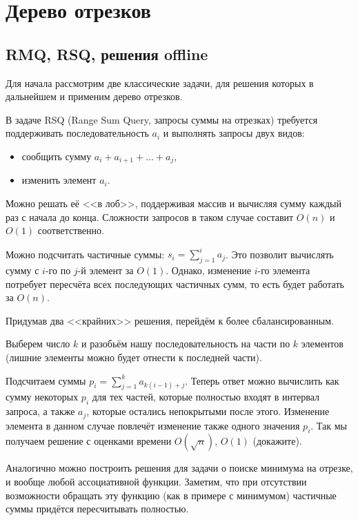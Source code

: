\documentclass[a4paper,12pt]{article}
\begin{document}
  \section{Дерево отрезков}

    \subsection{RMQ, RSQ, решения offline}

    Для начала рассмотрим две классические задачи, для
    решения которых в дальнейшем и применим дерево
    отрезков.

    В задаче RSQ (Range Sum Query, запросы суммы
    на отрезках) требуется поддерживать
    последовательность $a_i$ и выполнять запросы
    двух видов:
    \begin{itemize}
      \item сообщить сумму
        $a_i + a_{i+1} + \ldots + a_j$,
      \item изменить элемент $a_i$.
    \end{itemize}

    Можно решать её <<в лоб>>, поддерживая массив и
    вычисляя сумму каждый раз с начала до конца.
    Сложности запросов в таком случае составит
    $O(n)$ и $O(1)$ соответственно.

    Можно подсчитать частичные суммы:
    $s_i = \sum_{j=1}^{i}{a_j}$. Это позволит
    вычислять сумму с $i$-го по $j$-й элемент за
    $O(1)$. Однако, изменение $i$-го элемента потребует
    пересчёта всех последующих частичных сумм, то
    есть будет работать за $O(n)$.

    Придумав два <<крайних>> решения, перейдём
    к более сбалансированным.
    
    Выберем число $k$
    и разобьём нашу последовательность на части по $k$
    элементов (лишние элементы можно будет отнести
    к последней части).

    Подсчитаем суммы
    $p_i = \sum_{j=1}^{k}{a_{k(i-1)+j}}$.
    Теперь ответ можно вычислить как сумму некоторых
    $p_i$ для тех частей, которые полностью входят
    в интервал запроса, а также $a_j$, которые
    остались непокрытыми после этого.
    Изменение элемента в данном случае повлечёт
    изменение также одного значения $p_i$.
    Так мы получаем решение с оценками времени
    $O(\sqrt{n})$, $O(1)$ (докажите).

    Аналогично можно построить решения для задачи
    о поиске минимума на отрезке, и вообще любой
    ассоциативной функции. Заметим, что при отсутствии
    возможности обращать эту функцию (как в примере
    с минимумом) частичные суммы придётся пересчитывать
    полностью.
\end{document}
